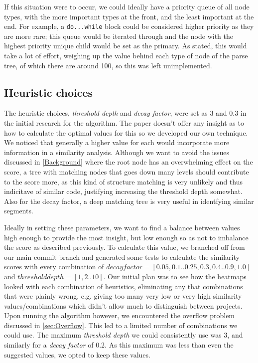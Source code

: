 If this situation were to occur, we could ideally have a priority queue of all
node types, with the more important types at the front, and the least important
at the end. For example, a \texttt{do...while} block could be considered higher
priority as they are more rare; this queue would be iterated through and the 
node with the highest priority unique child would be set as the primary. As stated,
this would take a lot of effort, weighing up the value behind each type of node
of the parse tree, of which there are around 100, so this was left unimplemented.



\subsection{Heuristic choices}
The heuristic choices, \emph{threshold depth} and \emph{decay factor}, were 
set as 3 and 0.3 in the initial research for the algorithm\cite{ParseTreeKernel}. 
The paper doesn't offer any insight as to how to calculate the optimal values
for this so we developed our own technique. We noticed that generally a higher value
for each would incorporate more information in a similarity analysis. Although we
want to avoid the issues discussed in \cref{Background} where the root node has
an overwhelming effect on the score, a tree with matching nodes that goes down
many levels should contribute to the score more, as this kind of structure matching
is very unlikely and thus indicitave of similar code, justifying increasing the
threshold depth somewhat. Also for the decay factor, a deep matching tree is
very useful in identfying similar segments.

Ideally in setting these parameters, we want to find a balance between values
high enough to provide the most insight, but low enough so as not to imbalance
the score as described previously. To calculate this value, we branched off
from our main commit branch and generated some tests to calculate the similarity
scores with every combination of $decay factor=[0.05, 0.1 .. 0.25, 0.3, 0.4 .. 0.9, 1.0]$
and $threshold depth=[1, 2 .. 10]$. Our initial plan was to see how the heatmaps
looked with each combination of heuristics, eliminating any that combinations
that were plainly wrong, e.g. giving too many very low or very high similarity
values/combinations which didn't allow much to distinguish between projects.
Upon running the algorithm however, we encountered the overflow problem discussed
in \cref{sec:Overflow}. This led to a limited number of combinations we could use.
The maximum \emph{threshold depth} we could consistently use was 3, and similarly for
a \emph{decay factor} of 0.2. As this maximum was less than even the suggested values,
we opted to keep these values.

